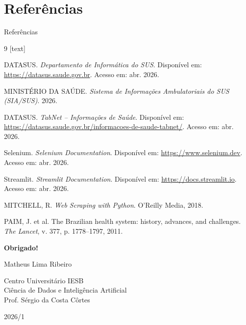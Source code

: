 \documentclass[aspectratio=169,10pt]{beamer}
\begin{document}
\section{Referências}
\begin{frame}{Referências}

\begin{thebibliography}{9}
[text]

 DATASUS. \textit{Departamento de Informática do SUS}. Disponível em: \url{https://datasus.saude.gov.br}. Acesso em: abr. 2026.

 MINISTÉRIO DA SAÚDE. \textit{Sistema de Informações Ambulatoriais do SUS (SIA/SUS)}. 2026.

 DATASUS. \textit{TabNet -- Informações de Saúde}. Disponível em: \url{https://datasus.saude.gov.br/informacoes-de-saude-tabnet/}. Acesso em: abr. 2026.

 Selenium. \textit{Selenium Documentation}. Disponível em: \url{https://www.selenium.dev}. Acesso em: abr. 2026.

 Streamlit. \textit{Streamlit Documentation}. Disponível em: \url{https://docs.streamlit.io}. Acesso em: abr. 2026.

 MITCHELL, R. \textit{Web Scraping with Python}. O'Reilly Media, 2018.

 PAIM, J. et al. The Brazilian health system: history, advances, and challenges. \textit{The Lancet}, v. 377, p. 1778--1797, 2011.

\end{thebibliography}

\end{frame}

\begin{frame}{}
\centering

\vspace{2cm}

{\Huge\color{iesbBlue}\textbf{Obrigado!}}

\vspace{1cm}

{\Large Matheus Lima Ribeiro}

\vspace{0.3cm}

{\normalsize Centro Universitário IESB\\
Ciência de Dados e Inteligência Artificial\\
Prof. Sérgio da Costa Côrtes}

\vspace{0.5cm}

{\small 2026/1}

\end{frame}
\end{document}
